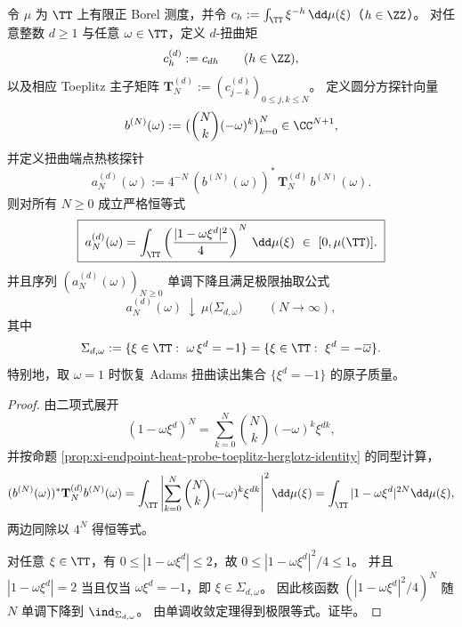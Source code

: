 
\begin{theorem}\label{thm:xi-endpoint-heat-probe-adams-twist-roots}\label{thm:xi-endpoint-heat-probe-cyclotomic-target-extraction}
令 \(\mu\) 为 \(\TT\) 上有限正 Borel 测度，并令 \(c_h:=\int_{\TT}\xi^{-h}\,\dd\mu(\xi)\)（\(h\in\ZZ\)）。
对任意整数 \(d\ge 1\) 与任意 \(\omega\in\TT\)，定义 \(d\)-扭曲矩
\[
c^{(d)}_h:=c_{dh}\qquad(h\in\ZZ),
\]
以及相应 Toeplitz 主子矩阵
\(
\mathbf{T}^{(d)}_N:=(c^{(d)}_{j-k})_{0\le j,k\le N}
\)。
定义圆分方探针向量
\[
b^{(N)}(\omega):=\bigl(\binom Nk(-\omega)^k\bigr)_{k=0}^{N}\in\CC^{N+1},
\]
并定义扭曲端点热核探针
\[
a_N^{(d)}(\omega):=4^{-N}\,(b^{(N)}(\omega))^\ast\,\mathbf{T}^{(d)}_N\,b^{(N)}(\omega).
\]
则对所有 \(N\ge 0\) 成立严格恒等式
\[
\boxed{\;
a_N^{(d)}(\omega)=\int_{\TT}\left(\frac{|1-\omega\xi^{d}|^2}{4}\right)^{N}\,\dd\mu(\xi)\ \in\ [0,\mu(\TT)].\;}
\]
并且序列 \((a_N^{(d)}(\omega))_{N\ge 0}\) 单调下降且满足极限抽取公式
\[
\boxed{\;
a_N^{(d)}(\omega)\ \downarrow\ \mu\bigl(\Sigma_{d,\omega}\bigr)\qquad(N\to\infty),\;}
\]
其中
\[
\Sigma_{d,\omega}:=\{\xi\in\TT:\ \omega\,\xi^{d}=-1\}
=\{\xi\in\TT:\ \xi^{d}=-\overline{\omega}\}.
\]
特别地，取 \(\omega=1\) 时恢复 Adams 扭曲读出集合 \(\{\xi^d=-1\}\) 的原子质量。
\end{theorem}

\begin{proof}
由二项式展开
\[
(1-\omega\xi^{d})^N=\sum_{k=0}^{N}\binom Nk(-\omega)^k\xi^{dk},
\]
并按命题 \ref{prop:xi-endpoint-heat-probe-toeplitz-herglotz-identity} 的同型计算，
\[
(b^{(N)}(\omega))^\ast \mathbf{T}^{(d)}_N b^{(N)}(\omega)
=\int_{\TT}\left|\sum_{k=0}^{N}\binom Nk(-\omega)^k\xi^{dk}\right|^2\dd\mu(\xi)
=\int_{\TT}|1-\omega\xi^{d}|^{2N}\dd\mu(\xi),
\]
两边同除以 \(4^N\) 得恒等式。
\par
对任意 \(\xi\in\TT\)，有 \(0\le |1-\omega\xi^{d}|\le 2\)，故
\(
0\le |1-\omega\xi^{d}|^2/4\le 1
\)。
并且 \(|1-\omega\xi^{d}|=2\) 当且仅当 \(\omega\xi^{d}=-1\)，即 \(\xi\in\Sigma_{d,\omega}\)。
因此核函数 \(\left(|1-\omega\xi^{d}|^2/4\right)^N\) 随 \(N\) 单调下降到 \(\ind_{\Sigma_{d,\omega}}\)。
由单调收敛定理得到极限等式。证毕。
\end{proof}

